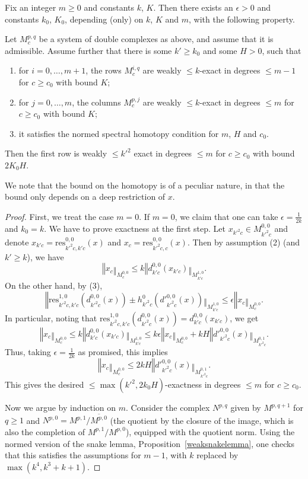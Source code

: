 \begin{proposition}
  \label{spectral}
  \leanok
  Fix an integer $m\geq 0$ and constants $k$, $K$.
  Then there exists an $\epsilon>0$ and constants $k_0$, $K_0$,
  depending (only) on $k$, $K$ and $m$, with the following property.

  Let $M^{p,q}_c$ be a system of double complexes as above,
  and assume that it is admissible.
  Assume further that there is some $k'\geq k_0$ and some $H>0$, such that
  \begin{enumerate}
	  \item for $i=0,\ldots,m+1$, the rows $M^{i,q}_c$ are weakly $\leq k$-exact in degrees $\leq m-1$ for $c\geq c_0$ with bound $K$;
	  \item for $j=0,\ldots,m$, the columns $M^{p,j}_c$ are weakly $\leq k$-exact in degrees $\leq m$ for $c\geq c_0$ with bound $K$;
    \item it satisfies the normed spectral homotopy condition for $m$, $H$ and $c_0$.
  \end{enumerate}
  Then the first row is weakly $\leq k'^2$ exact in degrees $\leq m$ for $c\geq c_0$ with bound $2K_0H$.
\end{proposition}

We note that the bound on the homotopy is of a peculiar nature, in that the bound only depends on a deep restriction of $x$.

\begin{proof}
  \leanok
  First, we treat the case $m=0$.
  If $m=0$, we claim that one can take $\epsilon=\tfrac 1{2k}$ and $k_0=k$.
  We have to prove exactness at the first step.
  Let $x_{k'^2c}\in M^{0,0}_{k'^2c}$ and
  denote $x_{k'c}=\mathrm{res}_{k'^2c,k'c}^{0,0}(x)$
  and $x_c=\mathrm{res}_{k'^2c,c}^{0,0}(x)$.
  Then by assumption (2) (and $k'\geq k$), we have
  \[
  ‖x_c‖_{M^{0,0}_c}\leq k‖d^{0,0}_{k'c}(x_{k'c})‖_{M^{1,0}_{k'c}}.
  \]
  On the other hand, by (3),
  \[
  ‖\mathrm{res}_{k'^2c,k'c}^{1,0}(d^{0,0}_{k'^2c}(x))\pm h^0_{k'^2c}(d'^{0,0}_{k'^2c}(x))‖_{M^{1,0}_{k'c}}\leq \epsilon ‖x_c‖_{M^{0,0}_c}.
  \]
  In particular, noting that $\mathrm{res}_{k'^2c,k'c}^{1,0}(d^{0,0}_{k'^2c}(x)) = d^{0,0}_{k'c}(x_{k'c})$, we get
  \[
  ‖x_c‖_{M^{0,0}_c}\leq k‖d^{0,0}_{k'c}(x_{k'c})‖_{M^{1,0}_{k'c}}\leq k\epsilon ‖x_c‖_{M^{0,0}_c} + kH ‖d'^{0,0}_{k'^2c}(x)‖_{M^{0,1}_{k'^2c}}.
  \]
  Thus, taking $\epsilon=\tfrac 1{2k}$ as promised, this implies
  \[
  ‖x_c‖_{M^{0,0}_c}\leq 2kH ‖d'^{0,0}_{k'^2c}(x)‖_{M^{0,1}_{k'^2c}}.
  \]
  This gives the desired $\leq \max(k'^2,2k_0H)$-exactness in degrees $\leq m$ for $c\geq c_0$.

  Now we argue by induction on $m$.
  Consider the complex $N^{p,q}$ given by $M^{p,q+1}$ for $q\geq 1$
  and $N^{p,0} = M^{p,1}/\overline{M^{p,0}}$
  (the quotient by the closure of the image, which is also the completion of $M^{p,1}/M^{p,0}$),
  equipped with the quotient norm.
  Using the normed version of the snake lemma,
  Proposition~\ref{weaksnakelemma},
  one checks that this satisfies the assumptions for $m-1$,
  with $k$ replaced by $\max(k^4,k^3+k+1)$.
\end{proof}

